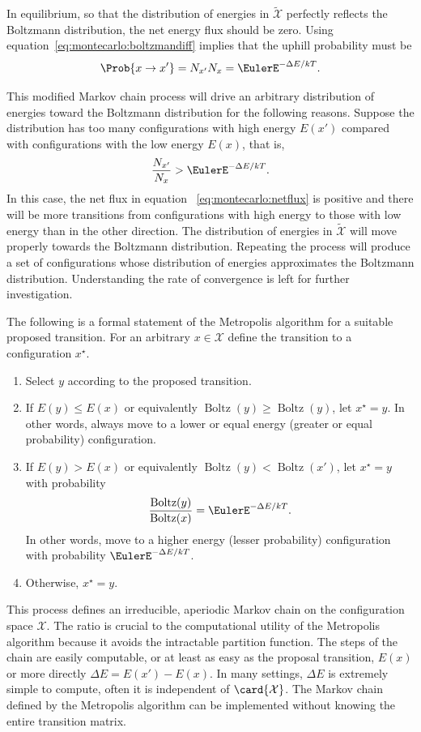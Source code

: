 \documentclass[12pt]{article}
\begin{document}
In equilibrium, so that the distribution of energies in \( \tilde{\mathcal
{X}} \) perfectly reflects the Boltzmann distribution, the net energy
flux should be zero.  Using equation~\eqref{eq:montecarlo:boltzmandiff}
implies that the uphill probability must be
\[
    \Prob{x \to x'} = {N_{x'}}{N_{x}} = \EulerE^{-\Delta E/kT}.
\]

This modified Markov chain process will drive an arbitrary distribution
of energies toward the Boltzmann distribution for the following reasons.
Suppose the distribution has too many configurations with high energy \(
E(x') \) compared with configurations with the low energy \( E(x) \),
that is,
\[
    \frac{N_{x'}}{N_{x}} > \EulerE^{-\Delta E/kT}.
\] In this case, the net flux in equation~%
\ref{eq:montecarlo:netflux} is positive and there will be more
transitions from configurations with high energy to those with low
energy than in the other direction.  The distribution of energies in \(
\tilde{\mathcal {X}} \) will move properly towards the Boltzmann
distribution.  Repeating the process will produce a set of
configurations whose distribution of energies approximates the Boltzmann
distribution.  Understanding the rate of convergence is left for further
investigation.

The following is a formal statement of the Metropolis algorithm for a
suitable proposed transition.  For an arbitrary \( x \in \mathcal{X} \)
define the transition to a configuration \( x^{\star} \).
\begin{enumerate}
    \item
        Select \( y \) according to the proposed transition.
    \item
        If \( E(y) \le E(x) \) or equivalently \(
        \operatorname{Boltz}
        (y) \ge
        \operatorname{Boltz}
        (y) \), let \( x^{\star} = y \).  In other words, always move to
        a lower or equal energy (greater or equal probability)
        configuration.
    \item
        If \( E(y) > E(x) \) or equivalently \(
        \operatorname{Boltz}
        (y) <
        \operatorname{Boltz}
        (x') \), let \( x^{\star} = y \) with probability
        \[
            \frac{%
            \operatorname{Boltz}
            (y)}{%
            \operatorname{Boltz}
            (x)} = \EulerE^{-\Delta E/kT}.
        \] In other words, move to a higher energy (lesser probability)
        configuration with probability \( \EulerE^{-\Delta E/kT} \).
    \item
        Otherwise, \( x^{\star} = y \).
\end{enumerate}
This process defines an irreducible, aperiodic Markov chain on the
configuration space \( \mathcal{X} \).  The ratio is crucial to the
computational utility of the Metropolis algorithm because it avoids the
intractable partition function.  The steps of the chain are easily
computable, or at least as easy as the proposal transition, \( E(x) \)
or more directly \( \Delta E = E(x') - E(x) \).  In many settings, \(
\Delta E \) is extremely simple to compute, often it is independent of \(
\card{\mathcal{X}} \).  The Markov chain defined by the Metropolis
algorithm can be implemented without knowing the entire transition
matrix.
\end{document}
